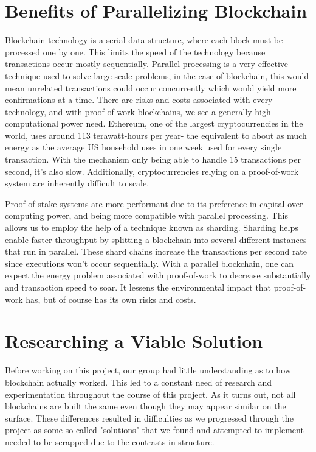 \section{Benefits of Parallelizing Blockchain}

Blockchain technology is a serial data structure, where each block must be processed one by one. This limits the speed of the technology because transactions occur mostly sequentially. Parallel processing is a very effective technique used to solve large-scale problems, in the case of blockchain, this would mean unrelated transactions could occur concurrently which would yield more confirmations at a time. 
There are risks and costs associated with every technology, and with proof-of-work blockchains, we see a generally high computational power need. Ethereum, one of the largest cryptocurrencies in the world, uses around 113 terawatt-hours per year- the equivalent to about as much energy as the average US household uses in one week used for every single transaction. With the mechanism only being able to handle 15 transactions per second, it’s also slow. Additionally, cryptocurrencies relying on a proof-of-work system are inherently difficult to scale.

Proof-of-stake systems are more performant due to its preference in capital over computing power, and being more compatible with parallel processing. This allows us to employ the help of a technique known as sharding. Sharding helps enable faster throughput by splitting a blockchain into several different instances that run in parallel. These shard chains increase the transactions per second rate since executions won’t occur sequentially. With a parallel blockchain, one can expect the energy problem associated with proof-of-work to decrease substantially and transaction speed to soar. It lessens the environmental impact that proof-of-work has, but of course has its own risks and costs.

\section{Researching a Viable Solution}

Before working on this project, our group had little understanding as to how blockchain actually worked. This led to a constant need of research and experimentation throughout the course of this project. As it turns out, not all blockchains are built the same even though they may appear similar on the surface. These differences resulted in difficulties as we progressed through the project as some so called "solutions" that we found and attempted to implement needed to be scrapped due to the contrasts in structure.

